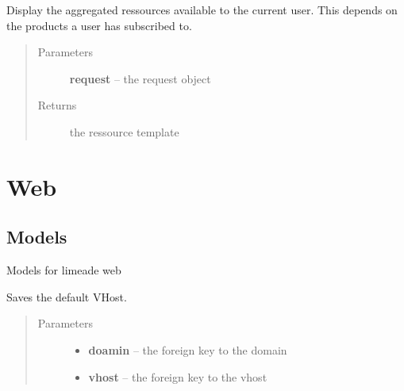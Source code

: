 \documentclass[letterpaper,10pt,english]{sphinxmanual}
\begin{document}
\begin{fulllineitems}
\label{api/system:limeade.system.views.ressources}
Display the aggregated ressources available to the current user. This 
depends on the products a user has subscribed to.
\begin{quote}\begin{description}
\item[{Parameters}] \leavevmode
\textbf{request} -- the request object

\item[{Returns}] \leavevmode
the ressource template

\end{description}\end{quote}

\end{fulllineitems}



\section{Web}
\label{api/web:web}\label{api/web::doc}

\subsection{Models}
\label{api/web:models}\label{api/web:module-limeade.web.models}
Models for limeade web

\begin{fulllineitems}
\label{api/web:limeade.web.models.DefaultVHost}
Saves the default VHost.
\begin{quote}\begin{description}
\item[{Parameters}] \leavevmode\begin{itemize}
\item {} 
\textbf{doamin} -- the foreign key to the domain

\item {} 
\textbf{vhost} -- the foreign key to the vhost

\end{itemize}

\end{description}\end{quote}

\end{fulllineitems}
\end{document}
